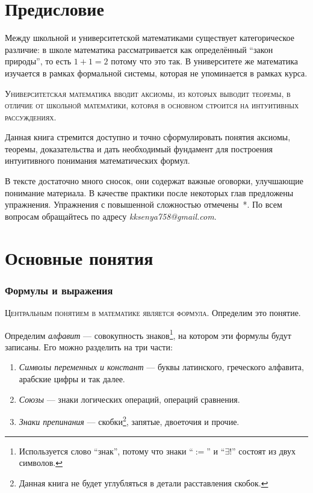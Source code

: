 \part{Предисловие}

Между школьной и университетской математиками существует категорическое
различие: в школе математика рассматривается как определённый ``закон природы'',
то есть $1+1=2$ потому что это так. В университете же математика изучается
в рамках формальной системы, которая не упоминается в рамках курса.

\textsc{Университетская математика вводит аксиомы, из которых выводит теоремы,
	в отличие от школьной математики, которая
	в основном строится на интуитивных рассуждениях.}

Данная книга стремится доступно и точно сформулировать понятия аксиомы,
теоремы, доказательства и дать необходимый фундамент для построения
интуитивного понимания математических формул.

В тексте достаточно много сносок, они содержат важные оговорки,
улучшающие понимание материала. В качестве практики
после некоторых глав предложены упражнения. Упражнения с повышенной сложностью
отмечены~*.
По всем вопросам обращайтесь по адресу {\sl kksenya758@gmail.com}.

\part{Основные понятия}

\section{Формулы и выражения}

\textsc{Центральным понятием в математике является формула.}
Определим это понятие.

Определим {\it алфавит} --- совокупность знаков\footnote{
	Используется слово ``знак'', потому что знаки ``$:=$'' и ``$\exists!$''
	состоят из двух символов.
}, на котором эти
формулы будут записаны. Его можно разделить на три части:
\begin{enumerate}
	\item{}{\it Символы переменных и констант} --- буквы латинского,
	греческого алфавита, арабские цифры и так далее.
	\item{}{\it Союзы} --- знаки логических операций, операций сравнения.
	\item{}{\it Знаки препинания} --- скобки\footnote{
		Данная книга не будет углубляться в детали расставления скобок.
	}, запятые, двоеточия и прочие.
\end{enumerate}

